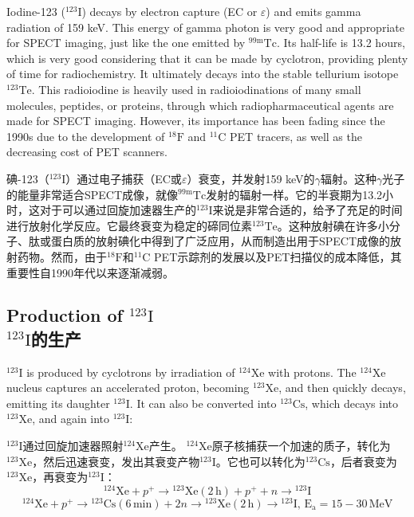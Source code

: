 \documentclass[dvipsnames, svgnames,a4paper,11pt]{article}
\begin{document}
Iodine-123 (\(\mathrm{^{123}I}\)) decays by electron capture (EC or \(\varepsilon\)) and emits gamma radiation of 159 keV. This energy of gamma photon is very good and appropriate for SPECT imaging, just like the one emitted by \(\mathrm{^{99m}Tc}\). Its half-life is 13.2 hours, which is very good considering that it can be made by cyclotron, providing plenty of time for radiochemistry. It ultimately decays into the stable tellurium isotope \(\mathrm{^{123}Te}\). This radioiodine is heavily used in radioiodinations of many small molecules, peptides, or proteins, through which radiopharmaceutical agents are made for SPECT imaging. However, its importance has been fading since the 1990s due to the development of \(\mathrm{^{18}F}\) and \(\mathrm{^{11}C}\) PET tracers, as well as the decreasing cost of PET scanners.

碘-123（\(\mathrm{^{123}I}\)）通过电子捕获（EC或\(\varepsilon\)）衰变，并发射159 keV的$\gamma$辐射。这种$\gamma$光子的能量非常适合SPECT成像，就像\(\mathrm{^{99m}Tc}\)发射的辐射一样。它的半衰期为13.2小时，这对于可以通过回旋加速器生产的\(\mathrm{^{123}I}\)来说是非常合适的，给予了充足的时间进行放射化学反应。它最终衰变为稳定的碲同位素\(\mathrm{^{123}Te}\)。这种放射碘在许多小分子、肽或蛋白质的放射碘化中得到了广泛应用，从而制造出用于SPECT成像的放射药物。然而，由于\(\mathrm{^{18}F}\)和\(\mathrm{^{11}C}\) PET示踪剂的发展以及PET扫描仪的成本降低，其重要性自1990年代以来逐渐减弱。



\subsection{Production of \(\mathrm{^{123}I}\)\\ \(\mathrm{^{123}I}\)的生产}  
\(\mathrm{^{123}I}\) is produced by cyclotrons by irradiation of \(\mathrm{^{124}Xe}\) with protons. The \(\mathrm{^{124}Xe}\) nucleus captures an accelerated proton, becoming \(\mathrm{^{123}Xe}\), and then quickly decays, emitting its daughter \(\mathrm{^{123}I}\). It can also be converted into \(\mathrm{^{123}Cs}\), which decays into \(\mathrm{^{123}Xe}\), and again into \(\mathrm{^{123}I}\):

\(\mathrm{^{123}I}\)通过回旋加速器照射\(\mathrm{^{124}Xe}\)产生。 \(\mathrm{^{124}Xe}\)原子核捕获一个加速的质子，转化为\(\mathrm{^{123}Xe}\)，然后迅速衰变，发出其衰变产物\(\mathrm{^{123}I}\)。它也可以转化为\(\mathrm{^{123}Cs}\)，后者衰变为\(\mathrm{^{123}Xe}\)，再衰变为\(\mathrm{^{123}I}\)：
\[
\mathrm{^{124}Xe} + p^{+} \rightarrow \mathrm{^{123}Xe} (2 \, \text{h}) + p^{+} + n \rightarrow \mathrm{^{123}I}
\]
\[
\mathrm{^{124}Xe} + p^{+} \rightarrow \mathrm{^{123}Cs} (6 \, \text{min}) + 2n \rightarrow \mathrm{^{123}Xe} (2 \, \text{h}) \rightarrow \mathrm{^{123}I}, \, \mathrm{E_a} = 15-30 \, \text{MeV}
\]
\end{document}
